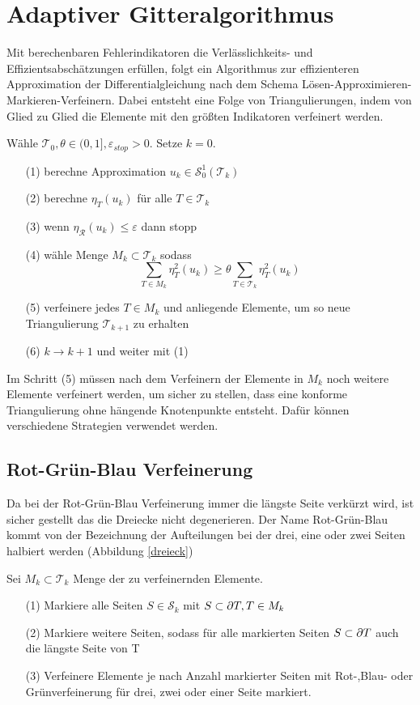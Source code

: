 \chapter{Adaptiver Gitteralgorithmus}
Mit berechenbaren Fehlerindikatoren die Verlässlichkeits- und Effizientsabschätzungen erfüllen, folgt ein Algorithmus zur effizienteren Approximation der Differentialgleichung nach dem Schema Lösen-Approximieren-Markieren-Verfeinern. Dabei entsteht eine Folge von Triangulierungen, indem von Glied zu Glied die Elemente mit den größten Indikatoren verfeinert werden.
\begin{algorithmus}
	Wähle $\mathscr{T}_0, \theta\in (0,1],\varepsilon_{stop}>0$. Setze $k=0$.
	\begin{itemize}
		\item[(1)] berechne Approximation $u_k\in\mathscr{S}_0^1(\mathscr{T}_k)$
		\item[(2)] berechne $\eta_T(u_k)$ für alle $T\in\mathscr{T}_k$
		\item[(3)] wenn $\eta_{\mathscr{R}}(u_k) \leq \varepsilon$ dann stopp
		\item[(4)] wähle Menge $M_k\subset\mathscr{T}_k$ sodass
		\[ \sum_{T\in M_k} \eta_T^2(u_k) \geq \theta\sum_{T\in\mathscr{T}_k}\eta_T^2(u_k)\]
		\item[(5)] verfeinere jedes $T\in M_k$ und anliegende Elemente, um so neue Triangulierung $\mathscr{T}_{k+1}$ zu erhalten
		\item[(6)] $k \rightarrow k + 1$ und weiter mit (1)
	\end{itemize}
\end{algorithmus}
Im Schritt (5) müssen nach dem Verfeinern der Elemente in $M_k$ noch weitere Elemente verfeinert werden, um sicher zu stellen, dass eine konforme Triangulierung ohne hängende Knotenpunkte entsteht. Dafür können verschiedene Strategien verwendet werden.

\section{Rot-Grün-Blau Verfeinerung}
Da bei der Rot-Grün-Blau Verfeinerung immer die längste Seite verkürzt wird, ist sicher gestellt das die Dreiecke nicht degenerieren. Der Name Rot-Grün-Blau kommt von der Bezeichnung der Aufteilungen bei der drei, eine oder zwei Seiten halbiert werden (Abbildung \ref{dreieck})
\newpage
\begin{algorithmus}
    Sei $M_k\subset \mathscr{T}_k$ Menge der zu verfeinernden Elemente.
	\begin{itemize}
		\item[(1)] Markiere alle Seiten $S \in \mathscr{S}_k$ mit $S \subset \partial T, T\in M_k$
		\item[(2)] Markiere weitere Seiten, sodass für alle markierten Seiten $S\subset \partial T$  auch die längste Seite von T
		\item[(3)] Verfeinere Elemente je nach Anzahl markierter Seiten mit  Rot-,Blau- oder Grünverfeinerung für drei, zwei oder einer Seite markiert.
	\end{itemize}
\end{algorithmus} 


